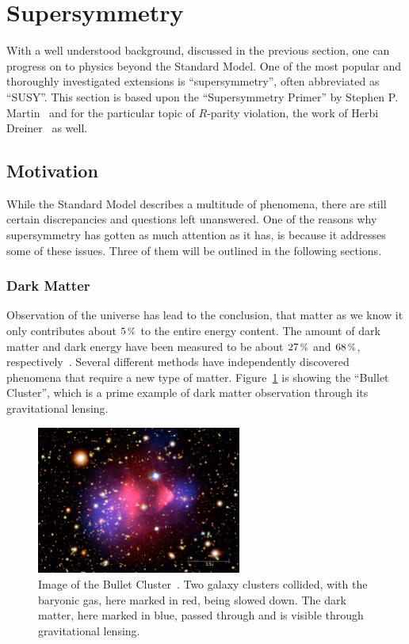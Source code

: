 \section{Supersymmetry}

With a well understood background, discussed in the previous section, one can progress on to physics beyond the Standard Model. One of the most popular and thoroughly investigated extensions is ``supersymmetry'', often abbreviated as ``SUSY''. This section is based upon the ``Supersymmetry Primer'' by Stephen P. Martin~\cite{susyprimer} and for the particular topic of $R$-parity violation, the work of Herbi Dreiner~\cite{b3def,b3p6} as well.

\subsection{Motivation}

While the Standard Model describes a multitude of phenomena, there are still certain discrepancies and questions left unanswered. One of the reasons why supersymmetry has gotten as much attention as it has, is because it addresses some of these issues. Three of them will be outlined in the following sections.

\subsubsection{Dark Matter}
\label{sec:dm}

Observation of the universe has lead to the conclusion, that matter as we know it only contributes about $5\,\pct$ to the entire energy content. The amount of dark matter and dark energy have been measured to be about $27\,\pct$ and $68\,\pct$, respectively~\cite{planck}. Several different methods have independently discovered phenomena that require a new type of matter. Figure~\ref{fig:gravlens} is showing the ``Bullet Cluster'', which is a prime example of dark matter observation through its gravitational lensing.

\begin{figure}[ht!]
  \centering
  \includegraphics[width=0.6\textwidth]{plots/bulletcluster.jpg}
  \caption{Image of the Bullet Cluster~\cite{gravlens}. Two galaxy clusters collided, with the baryonic gas, here marked in red, being slowed down. The dark matter, here marked in blue, passed through and is visible through gravitational lensing.}
  \label{fig:gravlens}
\end{figure}


